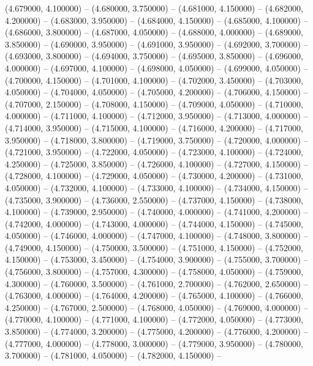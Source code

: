 (4.679000, 4.100000) -- 
(4.680000, 3.750000) -- 
(4.681000, 4.150000) -- 
(4.682000, 4.200000) -- 
(4.683000, 3.950000) -- 
(4.684000, 4.150000) -- 
(4.685000, 4.100000) -- 
(4.686000, 3.800000) -- 
(4.687000, 4.050000) -- 
(4.688000, 4.000000) -- 
(4.689000, 3.850000) -- 
(4.690000, 3.950000) -- 
(4.691000, 3.950000) -- 
(4.692000, 3.700000) -- 
(4.693000, 3.800000) -- 
(4.694000, 3.750000) -- 
(4.695000, 3.850000) -- 
(4.696000, 4.000000) -- 
(4.697000, 4.100000) -- 
(4.698000, 4.050000) -- 
(4.699000, 4.050000) -- 
(4.700000, 4.150000) -- 
(4.701000, 4.100000) -- 
(4.702000, 3.450000) -- 
(4.703000, 4.050000) -- 
(4.704000, 4.050000) -- 
(4.705000, 4.200000) -- 
(4.706000, 4.150000) -- 
(4.707000, 2.150000) -- 
(4.708000, 4.150000) -- 
(4.709000, 4.050000) -- 
(4.710000, 4.000000) -- 
(4.711000, 4.100000) -- 
(4.712000, 3.950000) -- 
(4.713000, 4.000000) -- 
(4.714000, 3.950000) -- 
(4.715000, 4.100000) -- 
(4.716000, 4.200000) -- 
(4.717000, 3.950000) -- 
(4.718000, 3.800000) -- 
(4.719000, 3.750000) -- 
(4.720000, 4.000000) -- 
(4.721000, 3.950000) -- 
(4.722000, 4.050000) -- 
(4.723000, 4.100000) -- 
(4.724000, 4.250000) -- 
(4.725000, 3.850000) -- 
(4.726000, 4.100000) -- 
(4.727000, 4.150000) -- 
(4.728000, 4.100000) -- 
(4.729000, 4.050000) -- 
(4.730000, 4.200000) -- 
(4.731000, 4.050000) -- 
(4.732000, 4.100000) -- 
(4.733000, 4.100000) -- 
(4.734000, 4.150000) -- 
(4.735000, 3.900000) -- 
(4.736000, 2.550000) -- 
(4.737000, 4.150000) -- 
(4.738000, 4.100000) -- 
(4.739000, 2.950000) -- 
(4.740000, 4.000000) -- 
(4.741000, 4.200000) -- 
(4.742000, 4.000000) -- 
(4.743000, 4.000000) -- 
(4.744000, 4.150000) -- 
(4.745000, 4.050000) -- 
(4.746000, 4.000000) -- 
(4.747000, 4.100000) -- 
(4.748000, 3.800000) -- 
(4.749000, 4.150000) -- 
(4.750000, 3.500000) -- 
(4.751000, 4.150000) -- 
(4.752000, 4.150000) -- 
(4.753000, 3.450000) -- 
(4.754000, 3.900000) -- 
(4.755000, 3.700000) -- 
(4.756000, 3.800000) -- 
(4.757000, 4.300000) -- 
(4.758000, 4.050000) -- 
(4.759000, 4.300000) -- 
(4.760000, 3.500000) -- 
(4.761000, 2.700000) -- 
(4.762000, 2.650000) -- 
(4.763000, 4.000000) -- 
(4.764000, 4.200000) -- 
(4.765000, 4.100000) -- 
(4.766000, 4.250000) -- 
(4.767000, 2.500000) -- 
(4.768000, 4.050000) -- 
(4.769000, 4.000000) -- 
(4.770000, 4.100000) -- 
(4.771000, 4.100000) -- 
(4.772000, 4.050000) -- 
(4.773000, 3.850000) -- 
(4.774000, 3.200000) -- 
(4.775000, 4.200000) -- 
(4.776000, 4.200000) -- 
(4.777000, 4.000000) -- 
(4.778000, 3.000000) -- 
(4.779000, 3.950000) -- 
(4.780000, 3.700000) -- 
(4.781000, 4.050000) -- 
(4.782000, 4.150000) -- 
